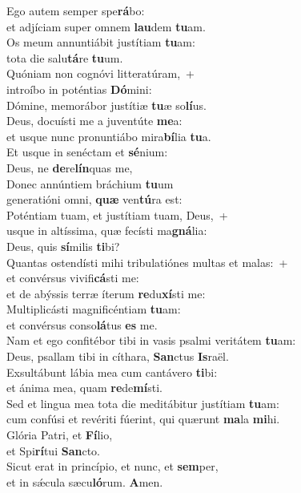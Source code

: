 \evenverse Ego autem semper spe\textbf{rá}bo:~\*\\
\evenverse et adjíciam super omnem \textbf{lau}dem \textbf{tu}am.\\
\oddverse Os meum annuntiábit justítiam \textbf{tu}am:~\*\\
\oddverse tota die salu\textbf{tá}re \textbf{tu}um.\\
\evenverse Quóniam non cognóvi litteratúram,~+\\
\evenverse  introíbo in poténtias \textbf{Dó}mini:~\*\\
\evenverse Dómine, memorábor justítiæ \textbf{tu}æ so\textbf{lí}us.\\
\oddverse Deus, docuísti me a juventúte \textbf{me}a:~\*\\
\oddverse et usque nunc pronuntiábo mira\textbf{bí}lia \textbf{tu}a.\\
\evenverse Et usque in senéctam et \textbf{sé}nium:~\*\\
\evenverse Deus, ne \textbf{de}re\textbf{lín}quas me,\\
\oddverse Donec annúntiem bráchium \textbf{tu}um~\*\\
\oddverse generatióni omni, \textbf{quæ} ven\textbf{tú}ra est:\\
\evenverse Poténtiam tuam, et justítiam tuam, Deus,~+\\
\evenverse  usque in altíssima, quæ fecísti ma\textbf{gná}lia:~\*\\
\evenverse Deus, quis \textbf{sí}milis \textbf{ti}bi?\\
\oddverse Quantas ostendísti mihi tribulatiónes multas et malas:~+\\
\oddverse  et convérsus vivifi\textbf{cá}sti me:~\*\\
\oddverse et de abýssis terræ íterum \textbf{re}du\textbf{xí}sti me:\\
\evenverse Multiplicásti magnificéntiam \textbf{tu}am:~\*\\
\evenverse et convérsus conso\textbf{lá}tus \textbf{es} me.\\
\oddverse Nam et ego confitébor tibi in vasis psalmi veritátem \textbf{tu}am:~\*\\
\oddverse Deus, psallam tibi in cíthara, \textbf{San}ctus \textbf{Is}raël.\\
\evenverse Exsultábunt lábia mea cum cantávero \textbf{ti}bi:~\*\\
\evenverse et ánima mea, quam \textbf{re}de\textbf{mí}sti.\\
\oddverse Sed et lingua mea tota die meditábitur justítiam \textbf{tu}am:~\*\\
\oddverse cum confúsi et revériti fúerint, qui quærunt \textbf{ma}la \textbf{mi}hi.\\
\evenverse Glória Patri, et \textbf{Fí}lio,~\*\\
\evenverse et Spi\textbf{rí}tui \textbf{San}cto.\\
\oddverse Sicut erat in princípio, et nunc, et \textbf{sem}per,~\*\\
\oddverse et in sǽcula sæcu\textbf{ló}rum. \textbf{A}men.\\
